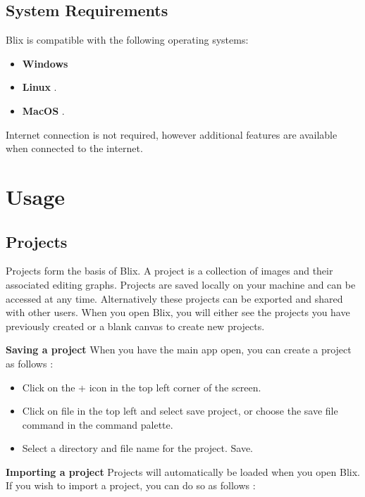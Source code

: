 \documentclass[11pt,a4paper]{article}
\begin{document}
\subsection*{System Requirements}

Blix is compatible with the following operating systems:
\begin{itemize}
  \item[\textbullet] \textbf{Windows}
  \item[\textbullet] \textbf{Linux }.
  \item[\textbullet] \textbf{MacOS }.
\end{itemize}

 Internet connection is not required, however additional features are available when connected to the internet.

\section*{Usage}

\subsection*{Projects}

Projects form the basis of Blix. A project is a collection of images and their associated editing graphs. Projects are saved locally on your machine and can be accessed at any time. 
Alternatively these projects can be exported and shared with other users. When you open Blix, you will either see the projects you have previously created or a blank canvas to create new projects.

\textbf{Saving a project}
When you have the main app open, you can create a project as follows : 

\begin{itemize}
  \item[\textbullet] Click on the + icon in the top left corner of the screen.
  \item[\textbullet] Click on file in the top left and select save project, or choose the save file command in the command palette.
  \item[\textbullet] Select a directory and file name for the project. Save.
\end{itemize}

\textbf{Importing a project}
Projects will automatically be loaded when you open Blix. If you wish to import a project, you can do so as follows : 
\end{document}
